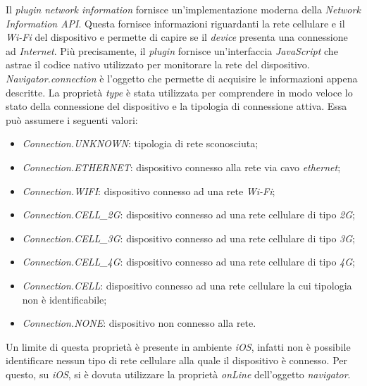 Il \textit{plugin} \textit{network information} fornisce un'implementazione moderna della \textit{Network Information API}. Questa fornisce informazioni riguardanti la rete cellulare e il \textit{Wi-Fi} del dispositivo e permette di capire se il \textit{device} presenta una connessione ad \textit{Internet}. Più precisamente, il \textit{plugin} fornisce un'interfaccia \textit{JavaScript} che astrae il codice nativo utilizzato per monitorare la rete del dispositivo. \textit{Navigator.connection} è l'oggetto che permette di acquisire le informazioni appena descritte. La proprietà \textit{type} è stata utilizzata per comprendere in modo veloce lo stato della connessione del dispositivo e la tipologia di connessione attiva. Essa può assumere i seguenti valori:
\begin{itemize}
	\item \textit{Connection.UNKNOWN}: tipologia di rete sconosciuta;
	\item \textit{Connection.ETHERNET}: dispositivo connesso alla rete via cavo \textit{ethernet};
	\item \textit{Connection.WIFI}: dispositivo connesso ad una rete \textit{Wi-Fi};
	\item \textit{Connection.CELL\_2G}: dispositivo connesso ad una rete cellulare di tipo \textit{2G};
	\item \textit{Connection.CELL\_3G}: dispositivo connesso ad una rete cellulare di tipo \textit{3G};
	\item \textit{Connection.CELL\_4G}: dispositivo connesso ad una rete cellulare di tipo \textit{4G};
	\item \textit{Connection.CELL}: dispositivo connesso ad una rete cellulare la cui tipologia non è identificabile;
	\item \textit{Connection.NONE}: dispositivo non connesso alla rete.
\end{itemize}
Un limite di questa proprietà è presente in ambiente \textit{iOS}, infatti non è possibile identificare nessun tipo di rete cellulare alla quale il dispositivo è connesso. Per questo, su \textit{iOS}, si è dovuta utilizzare la proprietà \textit{onLine} dell'oggetto \textit{navigator}.

